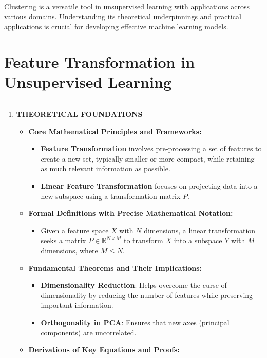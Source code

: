 \documentclass[
  12pt,
]{report}
\providecommand{\tightlist}{%
  \setlength{\itemsep}{0pt}\setlength{\parskip}{0pt}}
\begin{document}
Clustering is a versatile tool in unsupervised learning with applications across various domains. Understanding its theoretical underpinnings and practical applications is crucial for developing effective machine learning models.

\chapter{Feature Transformation in Unsupervised Learning}

\begin{center}\rule{0.5\linewidth}{0.5pt}\end{center}

\begin{enumerate}
\def\labelenumi{\arabic{enumi}.}
\item
  \textbf{THEORETICAL FOUNDATIONS}

  \begin{itemize}
  \tightlist
  \item
    \textbf{Core Mathematical Principles and Frameworks:}

    \begin{itemize}
    \tightlist
    \item
      \textbf{Feature Transformation} involves pre-processing a set of features to create a new set, typically smaller or more compact, while retaining as much relevant information as possible.
    \item
      \textbf{Linear Feature Transformation} focuses on projecting data into a new subspace using a transformation matrix \(P\).
    \end{itemize}
  \item
    \textbf{Formal Definitions with Precise Mathematical Notation:}

    \begin{itemize}
    \tightlist
    \item
      Given a feature space \(X\) with \(N\) dimensions, a linear transformation seeks a matrix \(P \in \mathbb{R}^{N \times M}\) to transform \(X\) into a subspace \(Y\) with \(M\) dimensions, where \(M \leq N\).
    \end{itemize}
  \item
    \textbf{Fundamental Theorems and Their Implications:}

    \begin{itemize}
    \tightlist
    \item
      \textbf{Dimensionality Reduction}: Helps overcome the curse of dimensionality by reducing the number of features while preserving important information.
    \item
      \textbf{Orthogonality in PCA}: Ensures that new axes (principal components) are uncorrelated.
    \end{itemize}
  \item
    \textbf{Derivations of Key Equations and Proofs:}


\end{itemize}
\end{enumerate}
\end{document}
